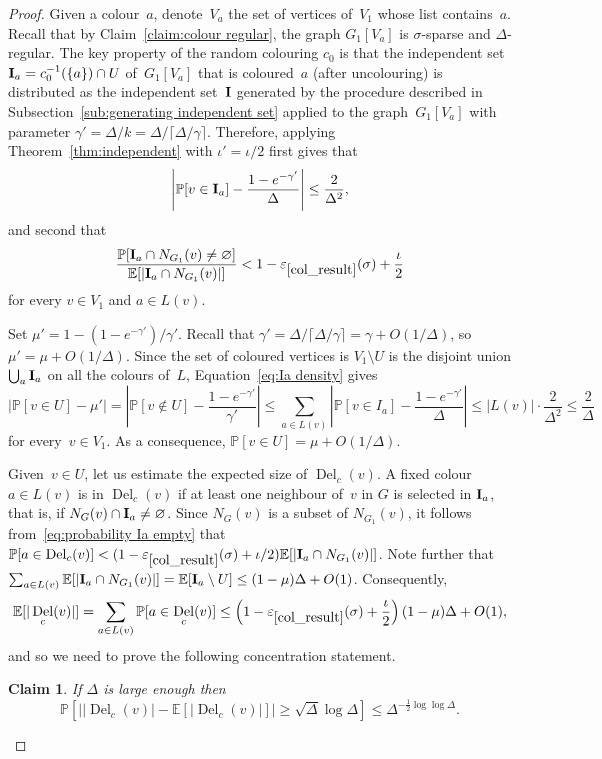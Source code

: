 \documentclass[11pt]{article}
\theoremstyle{plain}
\newcounter{claimcount}
\newtheorem{claim}[claimcount]{Claim}
\DeclareMathOperator{\Del}{Del}
\newcommand{\del}{\Del_c}
\newcommand{\Prob}{\mathbb{P}}
\newcommand{\E}{\mathbb{E}}
\newcommand{\bI}{{\bf{I}}}
\newcommand{\eps}{\varepsilon}
\begin{document}
\begin{proof}
Given a colour~$a$,
denote~$V_{a}$ the set of vertices of~$V_1$ whose list contains~$a$.
Recall that by Claim~\ref{claim:colour regular},
the graph $G_1[V_{a}]$ is $\sigma$-sparse and $\Delta$-regular.
The key property of the random colouring $c_0$ is that the independent set
$\bI_a=c_0^{-1}(\{a\})\cap U$ of~$G_1[V_a]$ that is coloured~$a$
(after uncolouring) is distributed as the independent set~$\bI$ generated by the procedure
described in Subsection~\ref{sub:generating independent set} applied to the graph~$G_1[V_a]$
with parameter
$\gamma'=\Delta/k=\Delta/\lceil\Delta/\gamma\rceil$.
%
Therefore, applying Theorem~\ref{thm:independent} with $\iota'=\iota/2$ first gives that
\begin{equation}\label{eq:Ia density}
\left|\Prob[v \in \bI_a] - \frac{1-e^{-\gamma'}}{\Delta}\right|\leq\frac{2}{\Delta^2},
\end{equation}
and second that
\begin{equation}\label{eq:probability Ia empty}
\frac{\Prob[\bI_a\cap N_{G_1}(v)\neq\varnothing]}{\E[|\bI_a\cap N_{G_1}(v)|]}< 1-\eps_{\ref{col_result}}(\sigma)+\frac{\iota}{2}
\end{equation}
for every $v\in V_1$ and $a\in L(v)$.

Set $\mu'=1-(1-e^{-\gamma'})/\gamma'$.
Recall that $\gamma'=\Delta/{\lceil\Delta/\gamma\rceil}=\gamma+O(1/\Delta)$, so
$\mu'=\mu+O(1/\Delta)$.
Since the set of coloured vertices is $V_1\setminus U$ is the disjoint union
$\bigcup_{a}\bI_a$ on all the colours of~$L$, Equation~\eqref{eq:Ia density} gives
\[
\left|\Prob[v \in U] - \mu'\right| =
\left|\Prob[v \notin U] - \frac{1-e^{-\gamma'}}{\gamma'}\right| \leq
\sum_{a\in L(v)}\left|\Prob[v \in I_a] -\frac{1-e^{-\gamma'}}{\Delta} \right|
\leq |L(v)|\cdot\frac{2}{\Delta^2}
\leq \frac{2}{\Delta}
\]
for every~$v\in V_1$.
As a consequence, $\Prob[v\in U]=\mu + O(1/\Delta)$.

Given~$v\in U$, let us estimate the expected size of $\del(v)$.
A fixed colour $a\in L(v)$ is in $\del(v)$
if at least one neighbour of~$v$ in $G$ is selected in $\bI_a$,
that is, if $N_G(v)\cap\bI_a\neq\varnothing$.
Since $N_{G}(v)$ is a subset of $N_{G_1}(v)$,
it follows from~\eqref{eq:probability Ia empty} that
$\Prob[a\in\del(v)]<
(1-\eps_{\ref{col_result}}(\sigma)+\iota/2)\E[|\bI_a\cap N_{G_1}(v)|]$.
Note further that
$\sum_{a\in L(v)}\E[|\bI_a\cap N_{G_1}(v)|]=\E[\bI_a\setminus U]\leq(1-\mu)\Delta+O(1)$.
Consequently,
\[
\E[|\del(v)|] = \sum_{a\in L(v)}\Prob[a\in\del(v)] \leq
\left(1-\eps_{\ref{col_result}}(\sigma)+\frac{\iota}{2}\right)(1-\mu)\Delta + O(1),
\]
and so we need to prove the following concentration statement.
\begin{claim}\label{claim:emptiness concentration}
  If $\Delta$ is large enough then \[
  \Prob[\left| |\del(v)| - \E[|\del(v)|]\right|
  \ge \sqrt{\Delta}\log\Delta]\le\Delta^{-\frac{1}{2}\log\log\Delta}.
    \]
\end{claim}



\end{proof}
\end{document}
